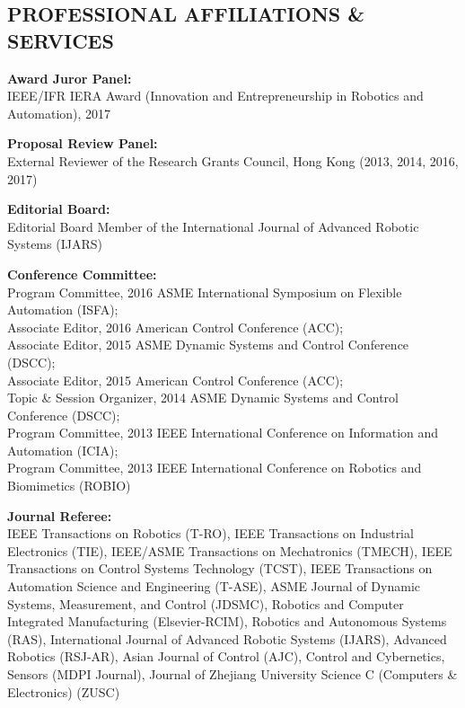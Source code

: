 \documentclass[UTF8,nofonts]{res}
\begin{document}
\begin{resume}
\section{PROFESSIONAL AFFILIATIONS \& SERVICES}
\vspace{0.1in}

    \textbf{Award Juror Panel:}\\
    IEEE/IFR IERA Award (Innovation and Entrepreneurship in Robotics and Automation), 2017
    
    \textbf{Proposal Review Panel:}\\ %
    External Reviewer of the Research Grants Council, Hong Kong (2013, 2014, 2016, 2017)
 	
    \textbf{Editorial Board:}\\ %
    Editorial Board Member of the International Journal of Advanced Robotic Systems (IJARS)

    \textbf{Conference Committee:}\\ %
    Program Committee, 2016 ASME International Symposium on Flexible Automation (ISFA);\\
    Associate Editor, 2016 American Control Conference (ACC);\\
    Associate Editor, 2015 ASME Dynamic Systems and Control Conference (DSCC);\\
    Associate Editor, 2015 American Control Conference (ACC);\\
    Topic \& Session Organizer, 2014 ASME Dynamic Systems and Control Conference (DSCC);\\
    Program Committee, 2013 IEEE International Conference on Information and Automation (ICIA);\\
    Program Committee, 2013 IEEE International Conference on Robotics and Biomimetics (ROBIO)%

    \textbf{Journal Referee:}\\
    IEEE Transactions on Robotics (T-RO),
    IEEE Transactions on Industrial Electronics (TIE),
    IEEE/ASME Transactions on Mechatronics (TMECH),
    IEEE Transactions on Control Systems Technology (TCST),
    IEEE Transactions on Automation Science and Engineering (T-ASE),
    ASME Journal of Dynamic Systems, Measurement, and Control (JDSMC),
    Robotics and Computer Integrated Manufacturing (Elsevier-RCIM),
    Robotics and Autonomous Systems (RAS),
    International Journal of Advanced Robotic Systems (IJARS),
    Advanced Robotics (RSJ-AR),
    Asian Journal of Control (AJC),
    Control and Cybernetics,
    Sensors (MDPI Journal),
    Journal of Zhejiang University Science C (Computers \& Electronics) (ZUSC)


\end{resume}
\end{document}
